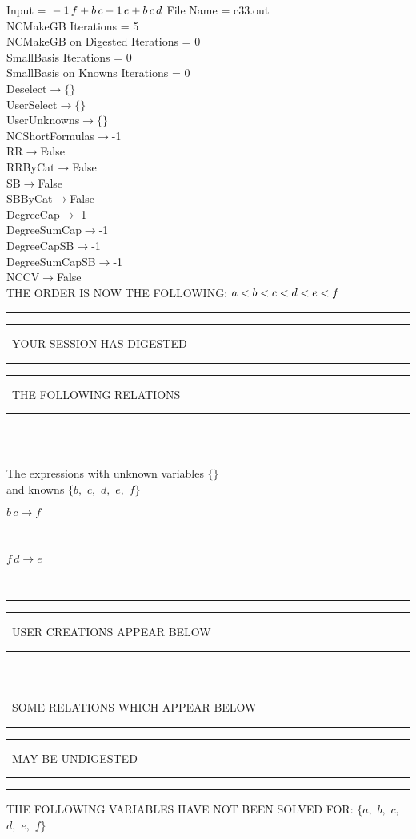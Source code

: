\documentclass[rep10,leqno]{report}
\begin{document}
\normalsize
\baselineskip=12pt
\noindent
Input = 
$
\\-1\,
 f + b\,
 c\\
-1\,
 e + b\,
 c\,
 d\\
$
File Name = c33.out\\
NCMakeGB Iterations = 5\\
NCMakeGB on Digested Iterations = 0\\
SmallBasis Iterations = 0\\
SmallBasis on Knowns Iterations = 0\\
Deselect$\rightarrow \{\}$\\
UserSelect$\rightarrow \{\}$\\
UserUnknowns$\rightarrow \{\}$\\
NCShortFormulas$\rightarrow$-1\\
RR$\rightarrow $False\\
RRByCat$\rightarrow $False\\
SB$\rightarrow $False\\
SBByCat$\rightarrow $False\\
DegreeCap$\rightarrow $-1\\
DegreeSumCap$\rightarrow $-1\\
DegreeCapSB$\rightarrow $-1\\
DegreeSumCapSB$\rightarrow $-1\\
NCCV$\rightarrow $False\\
THE ORDER IS NOW THE FOLLOWING:\hfil\break
$
a<b<c<d<e<f\\
$
\rule[2pt]{6in}{4pt}\hfil\break
\rule[2pt]{1.879in}{4pt}
\ YOUR SESSION HAS DIGESTED\ 
\rule[2pt]{1.879in}{4pt}\hfil\break
\rule[2pt]{1.923in}{4pt}
\ THE FOLLOWING RELATIONS\ 
\rule[2pt]{1.923in}{4pt}\hfil\break
\rule[2pt]{6in}{4pt}\hfil\break
\rule[3pt]{6in}{.7pt}\\
The expressions with unknown variables $\{\}$\\
and knowns $\{b,
$ $
c,
$ $
d,
$ $
e,
$ $
f\}$\smallskip\\
\begin{minipage}{6in}
$
b\,
 c\rightarrow f
$
\end{minipage}\medskip \\
\begin{minipage}{6in}
$
f\,
 d\rightarrow e
$
\end{minipage}\\
\rule[2pt]{6in}{1pt}\hfil\break
\rule[2.5pt]{1.701in}{1pt}
\ USER CREATIONS APPEAR BELOW\ 
\rule[2.5pt]{1.701in}{1pt}\hfil\break
\rule[2pt]{6in}{1pt}\hfil\break
\rule[2pt]{6in}{4pt}\hfil\break
\rule[2pt]{1.45in}{4pt}
\ SOME RELATIONS WHICH APPEAR BELOW\ 
\rule[2pt]{1.45in}{4pt}\hfil\break
\rule[2pt]{2.18in}{4pt}
\ MAY BE UNDIGESTED\ 
\rule[2pt]{2.18in}{4pt}\hfil\break
\rule[2pt]{6in}{4pt}\hfil\break
THE FOLLOWING VARIABLES HAVE NOT BEEN SOLVED FOR:\hfil\break
$\{a,
$ $
b,
$ $
c,
$ $
d,
$ $
e,
$ $
f\}$
\smallskip\\
\vspace{10pt}
\end{document}
